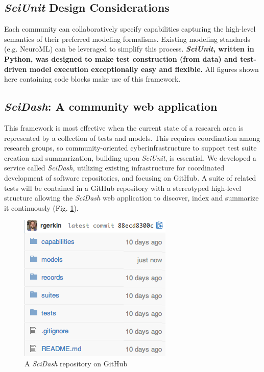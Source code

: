 \documentclass[11pt,letterpaper]{article}
\begin{document}
\subsection{\textit{SciUnit} Design Considerations}
Each community can collaboratively specify capabilities capturing the high-level semantics of their preferred modeling formalisms. 
Existing modeling standards (e.g. NeuroML\cite{neuroml_url,gleeson_neuroml:_2010}) can be leveraged to simplify this process. \textbf{\textit{SciUnit}, written in Python, was designed to make test construction (from data) and test-driven model execution exceptionally easy and flexible.} 
All figures shown here containing code blocks make use of this framework.
 
\subsection{\textit{SciDash}: A community web application}\label{sec:scidash}
This framework is most effective when the current state of a research area is represented by a collection of tests and models. 
This requires coordination among research groups, so community-oriented cyberinfrastructure to support test suite creation and summarization, building upon \textit{SciUnit}, is essential.
We developed a service called \textit{SciDash}, utilizing existing infrastructure for coordinated development of software repositories, and focusing on GitHub\cite{github_url}\cite{ram_git_2013}. 
A suite of related tests will be contained in a GitHub repository with a stereotyped high-level structure allowing the \textit{SciDash} web application to discover, index and summarize it continuously (Fig. \ref{fig:scidash_repo}).

\begin{figure}
\center
\vspace{-10px}
\includegraphics[scale=0.72]{scidash_github.png}
\caption{A \textit{SciDash} repository on GitHub}
\label{fig:scidash_repo}
\end{figure}
\vspace{-10px}
\leavevmode
\end{document}
